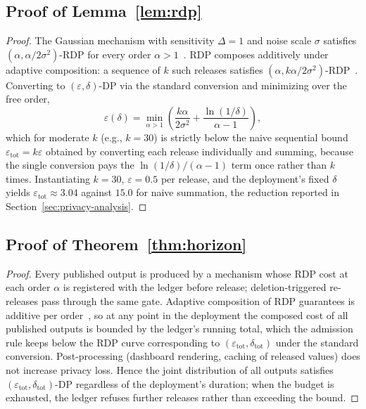 \documentclass[sigconf,anonymous,review]{acmart}
\begin{document}
\subsection{Proof of Lemma~\ref{lem:rdp}}
\begin{proof}
    The Gaussian mechanism with sensitivity $\Delta = 1$ and noise scale $\sigma$ satisfies $(\alpha, \alpha/2\sigma^2)$-RDP for every order $\alpha > 1$~\cite{Mironov2017}. RDP composes additively under adaptive composition: a sequence of $k$ such releases satisfies $(\alpha, k\alpha/2\sigma^2)$-RDP~\cite{Mironov2017}. Converting to $(\varepsilon, \delta)$-DP via the standard conversion and minimizing over the free order,
    \[
        \varepsilon(\delta) = \min_{\alpha>1} \left( \frac{k\alpha}{2\sigma^2} + \frac{\ln(1/\delta)}{\alpha-1} \right),
    \]
    which for moderate $k$ (e.g., $k = 30$) is strictly below the naive sequential bound $\varepsilon_{\mathrm{tot}} = k\varepsilon$ obtained by converting each release individually and summing, because the single conversion pays the $\ln(1/\delta)/(\alpha-1)$ term once rather than $k$ times. Instantiating $k=30$, $\varepsilon = 0.5$ per release, and the deployment's fixed $\delta$ yields $\varepsilon_{\mathrm{tot}} \approx 3.04$ against $15.0$ for naive summation, the reduction reported in Section~\ref{sec:privacy-analysis}.
\end{proof}

\subsection{Proof of Theorem~\ref{thm:horizon}}
\begin{proof}
    Every published output is produced by a mechanism whose RDP cost at each order $\alpha$ is registered with the ledger before release; deletion-triggered re-releases pass through the same gate. Adaptive composition of RDP guarantees is additive per order~\cite{Mironov2017}, so at any point in the deployment the composed cost of all published outputs is bounded by the ledger's running total, which the admission rule keeps below the RDP curve corresponding to $(\varepsilon_{\mathrm{tot}}, \delta_{\mathrm{tot}})$ under the standard conversion. Post-processing (dashboard rendering, caching of released values) does not increase privacy loss. Hence the joint distribution of all outputs satisfies $(\varepsilon_{\mathrm{tot}}, \delta_{\mathrm{tot}})$-DP regardless of the deployment's duration; when the budget is exhausted, the ledger refuses further releases rather than exceeding the bound.
\end{proof}
\end{document}
